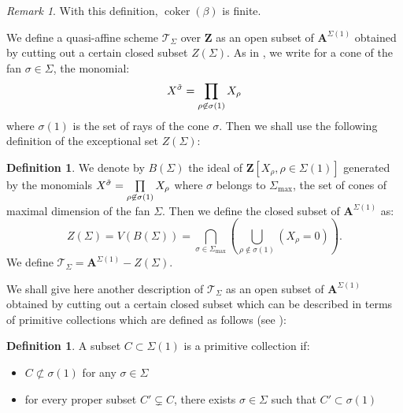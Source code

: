 \documentclass{proc-l}
\newcommand{\Z}{\mathbf{Z}}
\DeclareMathOperator{\coker}{coker}
\newcommand{\stackT}{\mathcal{T}}
\newcommand{\affine}{\mathbf{A}}
\theoremstyle{definition}
\newtheorem{definition}[theorem]{Definition}
\theoremstyle{remark}
\newtheorem{remark}[theorem]{Remark}
\numberwithin{equation}{section}
\begin{document}
\begin{remark}
    With this definition, $\coker(\beta)$ is finite.
\end{remark}

We define a quasi-affine scheme $\stackT_{\Sigma}$ over $\Z$ as an open subset of $\affine^{\Sigma(1)}$ obtained by cutting out a certain closed subset $Z(\Sigma)$. As in \cite[Chapter 5, §1]{CoxLittleSchenck2011}, we write for a cone of the fan $\sigma \in \Sigma$, the monomial:
$$ X^{\Tilde{\sigma}} = \prod\limits_{\rho \not\in \sigma(1)} X_{\rho} $$where $\sigma(1)$ is the set of rays of the cone $\sigma$. Then we shall use the following definition of the exceptional set $Z(\Sigma)$:

\begin{definition}
    We denote by $B(\Sigma)$ the ideal of $\Z[X_{\rho},\rho \in \Sigma(1)]$ generated by the monomials $X^{\Tilde{\sigma}} = \prod\limits_{\rho \not\in \sigma(1)} X_{\rho}$ where $\sigma$ belongs to $\Sigma_{\max}$, the set of cones of maximal dimension of the fan $\Sigma$. Then we define the closed subset of $\affine^{\Sigma(1)}$ as:
    $$Z(\Sigma) =  V(B(\Sigma)) = \bigcap\limits_{\sigma \in \Sigma_{\max}} \left( \bigcup\limits_{\rho \not\in \sigma(1)} \left( X_{\rho} = 0 \right) \right).$$We define $\stackT_{\Sigma} = \affine^{\Sigma(1)} - Z(\Sigma)$.
\end{definition}

We shall give here another description of $\stackT_{\Sigma}$ as an open subset of $\affine^{\Sigma(1)}$ obtained by cutting out a certain closed subset which can be described in terms of primitive collections which are defined as follows (see \cite[definition 5.1.5]{CoxLittleSchenck2011}):


\begin{definition}\label{def_primitive_collection}
    A subset $C \subset \Sigma(1)$ is a primitive collection if:
\begin{itemize}
    \item $C \not\subset \sigma(1)$ for any $\sigma \in \Sigma$
    \item for every proper subset $C' \subsetneq C$, there exists $\sigma \in \Sigma$ such that $C' \subset \sigma(1)$
\end{itemize}
\end{definition}
\end{document}
